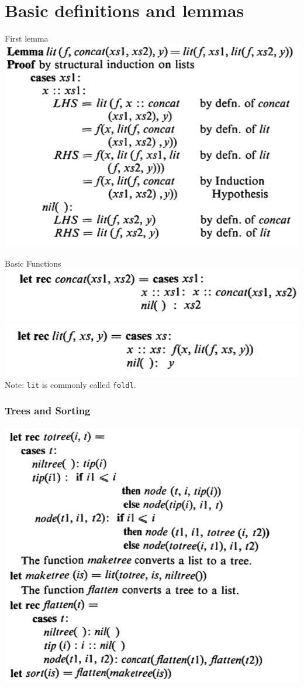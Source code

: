 \documentclass{beamer}
\newcommand{\code}[1]{\texttt{#1}}
\begin{document}
\section{Basic definitions and lemmas}
\begin{frame}
  \begin{block}{First lemma}
    \center\includegraphics[width=.5\textwidth]{./lit-concat-lemma.png}\\
  \end{block}
  \pause
  \begin{block}{Basic Functions}
    {\center \includegraphics[width=.5\textwidth]{./concat.png}\\
      \includegraphics[width=.5\textwidth]{./lit.png}\\}
    Note: \code{lit} is commonly called \code{foldl}.
  \end{block}
\end{frame} 

\begin{frame}
  \frametitle{Trees and Sorting}
  {\center \includegraphics[width=.5\textwidth]{./tree-fns.png}\\}
\end{frame} 
\end{document}
